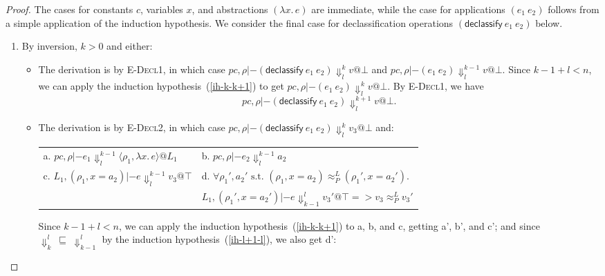 \documentclass{article}
\makeatletter
\theoremstyle{definition}
\newcommand{\at}{\ensuremath{{\scriptstyle{@}}}}
\newcommand{\pc}{\ensuremath{{\mathit{pc}}}}
\makeatother
\begin{document}
\begin{proof}
  The cases for constants $c$, variables $x$, and abstractions
  $(\lambda{x}.\, e)$ are immediate, while the case for applications
  $(e_1\ e_2)$ follows from a simple application of the induction hypothesis.
  We consider the final case for declassification operations
  $(\mathsf{declassify}\ e_1\ e_2)$ below.
    \begin{enumerate}
    \item By inversion, $k > 0$ and either:
      \begin{itemize}
      \item The derivation is by \textsc{E-Decl1}, in which case
        $\pc, \rho |- (\mathsf{declassify}\ e_1\ e_2)
        \Downarrow^{k}_{l}
        v \at \bot$ and
        $\pc, \rho |- (e_1\ e_2) \Downarrow^{k-1}_{l} v \at \bot$.
        Since $k-1 + l < n$, we can apply the induction
        hypothesis~(\ref{ih-k-k+1})
        to get
        $\pc, \rho |- (e_1\ e_2) \Downarrow^{k}_{l} v \at \bot$.
        By \textsc{E-Decl1}, we have
        \[\pc, \rho |- (\mathsf{declassify}\ e_1\ e_2) \Downarrow^{k+1}_{l}
        v \at \bot.\]
      \item The derivation is by \textsc{E-Decl2}, in which case
        $\pc, \rho |- (\mathsf{declassify}\ e_1\ e_2)
        \Downarrow^{k}_{l}
        v_3 \at \bot$ and:
        \begin{center}
          \begin{tabular*}{1.0\linewidth}{ll}
            a.
            $\pc, \rho |- e_1
            \Downarrow^{k-1}_{l}
            \langle{\rho_1, \lambda{x}.\, e\rangle} \at L_1$
            &
            b.
            $\pc, \rho |- e_2
            \Downarrow^{k-1}_{l}
            a_2$
            \\[1.8ex]
            c.
            $L_1, (\rho_1, x = a_2) |- e
            \Downarrow^{k-1}_{l}
            v_3 \at \top$
            &
            d.
            $\forall{\rho_1', a_2' \text{ s.t. }
              (\rho_1, x = a_2) \approx^{L}_{P} (\rho_1', x = a_2')}.$
            \\
            &
            \quad\quad
            $L_1, (\rho_1', x = a_2') |- e \Downarrow^{l}_{k-1} v_3' \at \top =>
            v_3 \approx^{L}_{P} v_3'$
          \end{tabular*}
        \end{center}
        Since $k-1 + l < n$, we can apply the induction
        hypothesis~(\ref{ih-k-k+1}) to a, b, and c, getting a', b', and c';
        and since $\Downarrow^{l}_{k}\ \sqsubseteq\ \Downarrow^{l}_{k-1}$ by
        the induction hypothesis~(\ref{ih-l+1-l}), we also get d':

\end{itemize}
\end{enumerate}
\end{proof}
\end{document}
